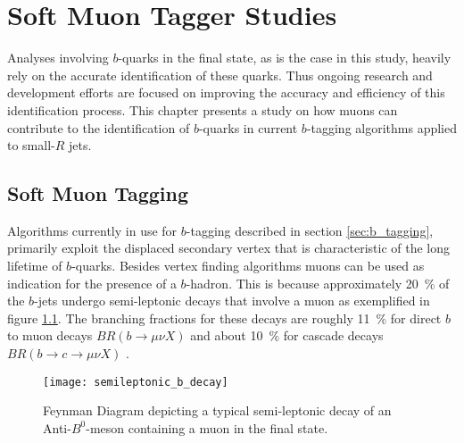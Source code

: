 \chapter{Soft Muon Tagger Studies}\label{ch:smt}
Analyses involving $b$-quarks in the final state, as is the case in this study, heavily rely on the accurate identification of these quarks. Thus ongoing research and development efforts are focused on improving the accuracy and efficiency of this identification process. This chapter presents a study on how muons can contribute to the identification of $b$-quarks in current $b$-tagging algorithms applied to small-$R$ jets.

\section{Soft Muon Tagging}
\label{sec:SoftMuonTagging}
Algorithms currently in use for $b$-tagging described in section \ref{sec:b_tagging}, primarily exploit the displaced secondary vertex that is characteristic of the long lifetime of $b$-quarks. Besides vertex finding algorithms muons can be used as indication for the presence of a $b$-hadron. This is because approximately \qty{20}{\percent} of the $b$-jets undergo semi-leptonic decays that involve a muon as exemplified in figure \ref{fig:semileptonicDecay}. The branching fractions for these decays are roughly \qty{11}{\percent} for direct $b$ to muon decays $BR( b \rightarrow \mu \nu X )$ and about \qty{10}{\percent} for cascade decays $BR( b \rightarrow c \rightarrow \mu \nu X )$ \citep{expectedPerformanceAtlas}.
\begin{figure}[]
  \centering
  \texttt{[image: semileptonic\_b\_decay]}
  \caption{Feynman Diagram depicting a typical semi-leptonic decay of an Anti-$B^0$-meson containing a muon in the final state.}
  \label{fig:semileptonicDecay}
\end{figure}

